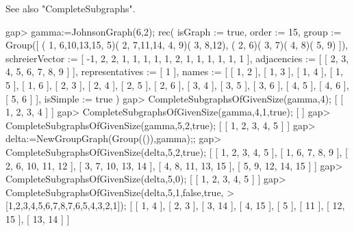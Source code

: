 See also "CompleteSubgraphs".

\beginexample
gap> gamma:=JohnsonGraph(6,2);                         
rec( isGraph := true, order := 15, 
  group := Group([ ( 1, 6,10,13,15, 5)( 2, 7,11,14, 4, 9)( 3, 8,12), 
      ( 2, 6)( 3, 7)( 4, 8)( 5, 9) ]), 
  schreierVector := [ -1, 2, 2, 1, 1, 1, 1, 1, 2, 1, 1, 1, 1, 1, 1 ], 
  adjacencies := [ [ 2, 3, 4, 5, 6, 7, 8, 9 ] ], representatives := [ 1 ], 
  names := [ [ 1, 2 ], [ 1, 3 ], [ 1, 4 ], [ 1, 5 ], [ 1, 6 ], [ 2, 3 ], 
      [ 2, 4 ], [ 2, 5 ], [ 2, 6 ], [ 3, 4 ], [ 3, 5 ], [ 3, 6 ], [ 4, 5 ], 
      [ 4, 6 ], [ 5, 6 ] ], isSimple := true )
gap> CompleteSubgraphsOfGivenSize(gamma,4);
[ [ 1, 2, 3, 4 ] ]
gap> CompleteSubgraphsOfGivenSize(gamma,4,1,true);
[  ]
gap> CompleteSubgraphsOfGivenSize(gamma,5,2,true);
[ [ 1, 2, 3, 4, 5 ] ]
gap> delta:=NewGroupGraph(Group(()),gamma);;
gap> CompleteSubgraphsOfGivenSize(delta,5,2,true);
[ [ 1, 2, 3, 4, 5 ], [ 1, 6, 7, 8, 9 ], [ 2, 6, 10, 11, 12 ], 
  [ 3, 7, 10, 13, 14 ], [ 4, 8, 11, 13, 15 ], [ 5, 9, 12, 14, 15 ] ]
gap> CompleteSubgraphsOfGivenSize(delta,5,0);
[ [ 1, 2, 3, 4, 5 ] ]
gap> CompleteSubgraphsOfGivenSize(delta,5,1,false,true,
>       [1,2,3,4,5,6,7,8,7,6,5,4,3,2,1]);
[ [ 1, 4 ], [ 2, 3 ], [ 3, 14 ], [ 4, 15 ], [ 5 ], [ 11 ], [ 12, 15 ], 
  [ 13, 14 ] ]
\endexample
